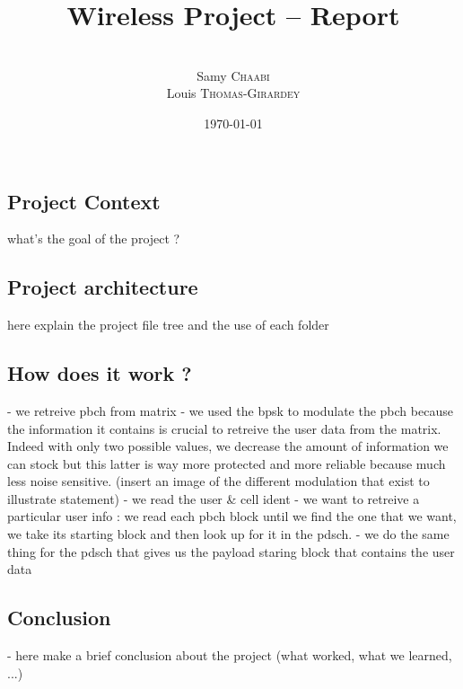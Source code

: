 \documentclass[a4paper, 12pt, twoside]{article}
\title{Wireless Project -- Report}
\author{
    \\ Samy \textsc{Chaabi}
    \\ Louis \textsc{Thomas-Girardey}
}
\date{
    \today
    \\
    $\phantom{a}$
}
\begin{document}
    
    \maketitle

    \newpage
    
    \tableofcontents
    \listoffigures
    \listoftables
    \listofalgorithms
    \newpage

    \begin{indt}{\section{Project Context}} %
        what's the goal of the project ?
    \end{indt}

    \begin{indt}{\section{Project architecture}}
        here explain the project file tree and the use of each folder
    \end{indt}

    \begin{indt}{\section{How does it work ?}}
        - we retreive pbch from matrix
        - we used the bpsk to modulate the pbch because the information it contains is crucial to retreive the user data from the matrix. Indeed with only two possible values, we decrease the amount of information we can stock but this latter is way more protected and more reliable because much less noise sensitive. (insert an image of the different modulation that exist to illustrate statement)
        - we read the user & cell ident
        - we want to retreive a particular user info : we read each pbch block until we find the one that we want, we take its starting block and then look up for it in the pdsch.
        - we do the same thing for the pdsch that gives us the payload staring block that contains the user data
    \end{indt}

    \begin{indt}{\section{Conclusion}}
        - here make a brief conclusion about the project (what worked, what we learned, ...)
    \end{indt}
    
\end{document}
